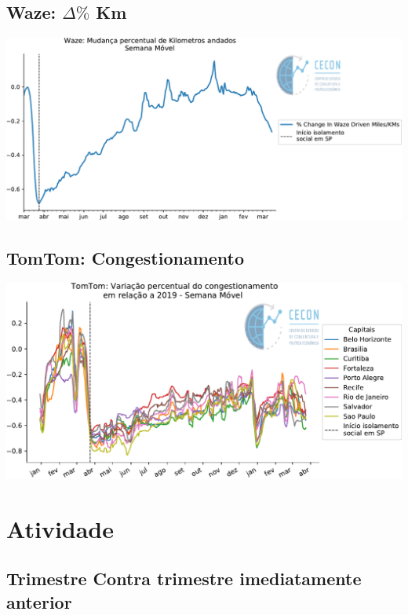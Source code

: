 \documentclass{SelfArx}
\begin{document}
\subsection*{Waze: \(\Delta \%\) Km}
\label{sec:orgcfe4818}

\begin{center}
\includegraphics[width=.9\linewidth]{./figs/Granulares/Waze_Brasil.pdf}
\end{center}

\subsection*{TomTom: Congestionamento}
\label{sec:org9dcba9c}

\begin{center}
\includegraphics[width=.9\linewidth]{./figs/Granulares/TomTom_Brasil.pdf}
\end{center}

\section*{Atividade}
\label{sec:org6c3bfb2}



\subsection*{Trimestre Contra trimestre imediatamente anterior}
\label{sec:org772cad8}
\end{document}
